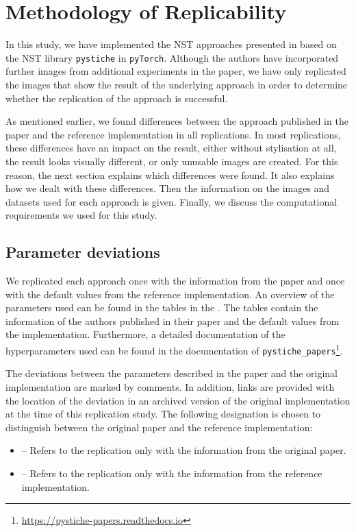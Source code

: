 \section{Methodology of Replicability}
In this study, we have implemented the \gls{NST} approaches presented in  based on the \gls{NST} library \texttt{pystiche} \cite{ML2020} in \texttt{pyTorch}. Although the authors have incorporated further images from additional experiments in the paper, we have only replicated the images that show the result of the underlying approach in order to determine whether the replication of the approach is successful. 

As mentioned earlier, we found differences between the approach published in the paper and the reference implementation in all replications. In most replications, these differences have an impact on the result, either without stylisation at all, the result looks visually different, or only unusable images are created. For this reason, the next section explains which differences were found. It also explains how we dealt with these differences. Then the information on the images and datasets used for each approach is given. Finally, we discuss the computational requirements we used for this study. 

\subsection{Parameter deviations} \label{sec:replicability}
We replicated each approach once with the information from the paper and once with the default values from the reference implementation. An overview of the parameters used can be found in the tables in the . The tables contain the information of the authors published in their paper and the default values from the implementation. Furthermore, a detailed documentation of the hyperparameters used can be found in the documentation of \texttt{pystiche\_papers}\footnote{\url{https://pystiche-papers.readthedocs.io}}. 

The deviations between the parameters described in the paper and the original implementation are marked by comments. In addition, links are provided with the location of the deviation in an archived version of the original implementation at the time of this replication study. The following designation is chosen to distinguish between the original paper and the reference implementation: 
\begin{itemize}
	\item \paper{} -- Refers to the replication only with the information from the original paper. 
	\item \implementation{} -- Refers to the replication only with the information from the reference implementation. 
\end{itemize}

